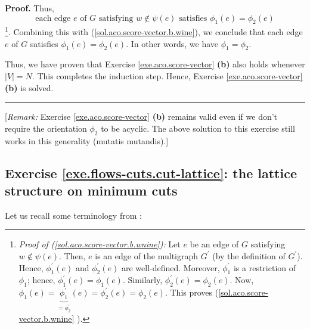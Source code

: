 \documentclass[numbers=enddot,12pt,final,onecolumn,notitlepage]{scrartcl}%
\newcounter{exer}
\theoremstyle{definition}
\newenvironment{proof}[1][Proof]{\noindent\textbf{#1.} }{\ \rule{0.5em}{0.5em}}
\begin{document}
\begin{proof}
Thus,%
\begin{equation}
\text{each edge }e\text{ of }G\text{ satisfying }w\notin\psi\left(  e\right)
\text{ satisfies }\phi_{1}\left(  e\right)  =\phi_{2}\left(  e\right)
\label{sol.aco.score-vector.b.wnine}%
\end{equation}
\footnote{\textit{Proof of (\ref{sol.aco.score-vector.b.wnine}):} Let $e$ be
an edge of $G$ satisfying $w\notin\psi\left(  e\right)  $. Then, $e$ is an
edge of the multigraph $G^{\prime}$ (by the definition of $G^{\prime}$).
Hence, $\phi_{1}^{\prime}\left(  e\right)  $ and $\phi_{2}^{\prime}\left(
e\right)  $ are well-defined. Moreover, $\phi_{1}^{\prime}$ is a restriction
of $\phi_{1}$; hence, $\phi_{1}^{\prime}\left(  e\right)  =\phi_{1}\left(
e\right)  $. Similarly, $\phi_{2}^{\prime}\left(  e\right)  =\phi_{2}\left(
e\right)  $. Now, $\phi_{1}\left(  e\right)  =\underbrace{\phi_{1}^{\prime}%
}_{=\phi_{2}^{\prime}}\left(  e\right)  =\phi_{2}^{\prime}\left(  e\right)
=\phi_{2}\left(  e\right)  $. This proves (\ref{sol.aco.score-vector.b.wnine}%
).}. Combining this with (\ref{sol.aco.score-vector.b.wine}), we conclude that
each edge $e$ of $G$ satisfies $\phi_{1}\left(  e\right)  =\phi_{2}\left(
e\right)  $. In other words, we have $\phi_{1}=\phi_{2}$.

Thus, we have proven that Exercise \ref{exe.aco.score-vector} \textbf{(b)}
also holds whenever $\left\vert V\right\vert =N$. This completes the induction
step. Hence, Exercise \ref{exe.aco.score-vector} \textbf{(b)} is solved.
\end{proof}

[\textit{Remark:}
Exercise \ref{exe.aco.score-vector} \textbf{(b)} remains valid
even if we don't require the orientation $\phi_2$ to be acyclic.
The above solution to this exercise still works in this
generality (mutatis mutandis).]

\subsection{Exercise \ref{exe.flows-cuts.cut-lattice}: the
lattice structure on minimum cuts}

Let us recall some terminology from
\cite{lec16}:
\end{document}
